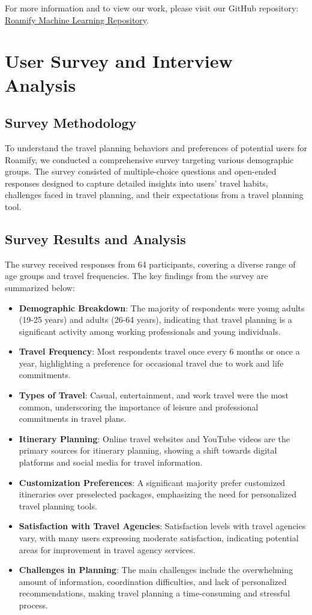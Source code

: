 \documentclass[conference]{IEEEtran}
\begin{document}
For more information and to view our work, please visit our GitHub repository: \href{https://github.com/RoamifyRedefined/Machine-Learning}{Roamify Machine Learning Repository}.

\section{User Survey and Interview Analysis}

\subsection{Survey Methodology}
To understand the travel planning behaviors and preferences of potential users for Roamify, we conducted a comprehensive survey targeting various demographic groups. The survey consisted of multiple-choice questions and open-ended responses designed to capture detailed insights into users' travel habits, challenges faced in travel planning, and their expectations from a travel planning tool.

\subsection{Survey Results and Analysis}
The survey received responses from 64 participants, covering a diverse range of age groups and travel frequencies. The key findings from the survey are summarized below:

\begin{itemize}
    \item \textbf{Demographic Breakdown}: The majority of respondents were young adults (19-25 years) and adults (26-64 years), indicating that travel planning is a significant activity among working professionals and young individuals.
    \item \textbf{Travel Frequency}: Most respondents travel once every 6 months or once a year, highlighting a preference for occasional travel due to work and life commitments.
    \item \textbf{Types of Travel}: Casual, entertainment, and work travel were the most common, underscoring the importance of leisure and professional commitments in travel plans.
    \item \textbf{Itinerary Planning}: Online travel websites and YouTube videos are the primary sources for itinerary planning, showing a shift towards digital platforms and social media for travel information.
    \item \textbf{Customization Preferences}: A significant majority prefer customized itineraries over preselected packages, emphasizing the need for personalized travel planning tools.
    \item \textbf{Satisfaction with Travel Agencies}: Satisfaction levels with travel agencies vary, with many users expressing moderate satisfaction, indicating potential areas for improvement in travel agency services.
    \item \textbf{Challenges in Planning}: The main challenges include the overwhelming amount of information, coordination difficulties, and lack of personalized recommendations, making travel planning a time-consuming and stressful process.
\end{itemize}
\end{document}
